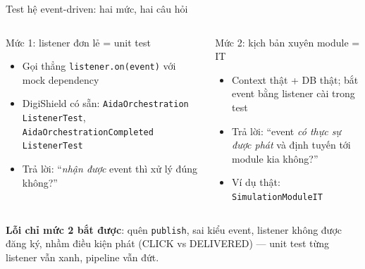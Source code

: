 \documentclass[aspectratio=169,12pt]{beamer}
\begin{document}
\begin{frame}{Test hệ event-driven: hai mức, hai câu hỏi}
  \begin{columns}[t]
    \begin{block}{Mức 1: listener đơn lẻ = unit test}
      \begin{itemize}\small
        \item Gọi thẳng \texttt{listener.on(event)} với mock dependency
        \item DigiShield có sẵn: \texttt{Aida\allowbreak Orchestration\allowbreak
          Listener\allowbreak Test},
          \texttt{Aida\allowbreak Orchestration\allowbreak Completed\allowbreak
          Listener\allowbreak Test}
        \item Trả lời: ``\emph{nhận được} event thì xử lý đúng không?''
      \end{itemize}
    \end{block}
    \begin{block}{Mức 2: kịch bản xuyên module = IT}
      \begin{itemize}\small
        \item Context thật + DB thật; bắt event bằng listener cài trong test
        \item Trả lời: ``event \emph{có thực sự được phát} và định tuyến tới
          module kia không?''
        \item Ví dụ thật: \texttt{SimulationModuleIT}
      \end{itemize}
    \end{block}
  \end{columns}
  \vspace{0.3em}
  {\small \textbf{Lỗi chỉ mức 2 bắt được}: quên \texttt{publish}, sai kiểu
  event, listener không được đăng ký, nhầm điều kiện phát (CLICK vs DELIVERED)
  --- unit test từng listener vẫn xanh, pipeline vẫn đứt.}
\end{frame}
\end{document}

